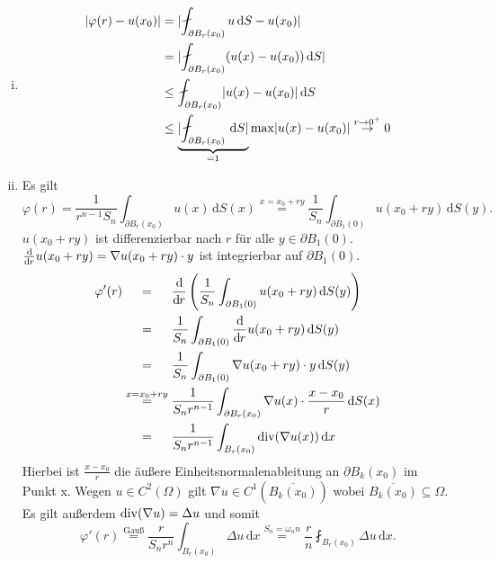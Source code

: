 	\begin{beweis}
		\begin{enumerate}[(i)]
			\item \begin{align*}
				\abs{ \varphi(r)-u(x_0)} &= \abs{ \fint_{\partial B_r(x_0)}^{}u \,\mathrm{d}S - u(x_0)} \\
				&= \abs{ \fint_{\partial B_r(x_0)}^{} (u(x)-u(x_0)) \,\mathrm{d}S} \\
				& \leq \fint_{\partial B_r(x_0)}^{} \abs{u(x)-u(x_0)} \,\mathrm{d}S \\
				& \leq  \underset{=1}{\underbrace{\abs{\fint_{\partial B_r(x_0)}^{} \,\mathrm{d}S}}} \max \abs{u(x)-u(x_0)} \stackrel{r \to 0^+}{\to} 0
			\end{align*}
		\item Es gilt
		\begin{equation}
			\varphi(r) = \frac{1}{r^{n-1}S_n} \int_{\partial B_r(x_0)}^{}u(x) \,\mathrm{d}S(x) \stackrel{x=x_0 + r y}{=} \frac{1}{S_n} \int_{\partial B_1(0)}^{} u(x_0 + ry) \,\mathrm{d}S(y).
		\end{equation}
		$u(x_0 + ry)$ ist differenzierbar nach $r$ für alle $y \in \partial B_1(0)$. \\
		$\frac{\mathrm{d}\mkern-1.0mu }{\mathrm{d}\mkern-1.0mu r} u(x_0 + ry) =  \nabla u(x_0+ry) \cdot y$ ist integrierbar auf $ \partial B_1(0)$.
		\begin{align*}
			\varphi'(r) &\stackrel{\hphantom{x=x_0+ry}}{=} \frac{\mathrm{d}\mkern-1.0mu }{\mathrm{d}\mkern-1.0mu r}  \left( \frac{1}{S_n} \int_{\partial B_1(0)}^{} u(x_0 + ry) \,\mathrm{d}S(y) \right) \\
			& \stackrel{\hphantom{x=x_0+ry}}{=} \frac{1}{S_n} \int_{\partial B_1(0)}^{} \frac{\mathrm{d}\mkern-1.0mu }{\mathrm{d}\mkern-1.0mu r}  u(x_0 + ry) \,\mathrm{d}S(y) \\
			& \stackrel{\hphantom{x=x_0+ry}}{=} \frac{1}{S_n} \int_{\partial B_1(0)}^{} \nabla u(x_0 + r y) \cdot y \,\mathrm{d}S(y) \\
			& \stackrel{x=x_0+ry}{=} \frac{1}{S_n r^{n-1}} \int_{\partial B_r(x_0)}^{}  \nabla u(x) \cdot \frac{x-x_0}{r} \,\mathrm{d}S(x) \\
			&\stackrel{\hphantom{x=x_0+ry}}{=} \frac{1}{S_n r^{n-1}} \int_{ B_r(x_0)}^{} \operatorname{div} (  \nabla u(x)) \,\mathrm{d}x
		\end{align*}
		Hierbei ist $\frac{x-x_0}{r}$ die äußere Einheitsnormalenableitung an $\partial B_k(x_0)$ im Punkt x. 
		Wegen $u \in C^2(\Omega)$ gilt $ \nabla u \in C^1( \overline{B_k(x_0)})$ wobei $\overline{B_k(x_0)} \subseteq \Omega$. \\
		Es gilt außerdem $\operatorname{div}(  \nabla u) = \Delta u$ und somit
		\begin{equation}
			\varphi'(r) \stackrel{\text{Gauß}}{=} \frac{r}{S_n r^n} \int_{B_r(x_0)}^{} \Delta u \,\mathrm{d}x 
			\stackrel{S_n = \omega_n n}{=} \frac{r}{n} \fint_{B_r(x_0)}^{} \Delta u \,\mathrm{d}x.
		\end{equation}
		\end{enumerate}
		
	\end{beweis}

